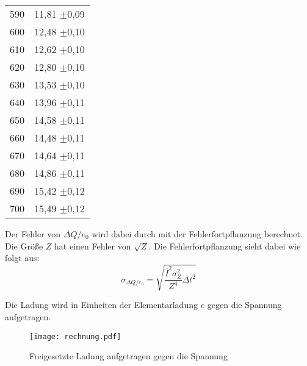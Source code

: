 \begin{table}[H]
\begin{tabular}{c c}
      590 &        11,81   $\pm$0,09 \\
      600 &        12,48   $\pm$0,10 \\
      610 &        12,62   $\pm$0,10 \\
      620 &        12,80   $\pm$0,10 \\
      630 &        13,53   $\pm$0,10 \\
      640 &        13,96   $\pm$0,11 \\
      650 &        14,58   $\pm$0,11 \\
      660 &        14,48   $\pm$0,11 \\
      670 &        14,64   $\pm$0,11 \\
      680 &        14,86   $\pm$0,11 \\
      690 &        15,42   $\pm$0,12 \\
      700 &        15,49   $\pm$0,12 \\
    \bottomrule
  \end{tabular}
\end{table}

Der Fehler von $\Delta Q/e_0$ wird dabei durch mit der Fehlerfortpflanzung berechnet. Die Größe $Z$ hat einen Fehler von $\sqrt{Z}$.
Die Fehlerfortpflanzung sieht dabei wie folgt aus:
\begin{equation*}
  \sigma_{\Delta Q/e_0} =\sqrt{ \frac{\overline{I}^{2} \sigma_{Z}^{2}}{Z^{4}} \Delta t^{2}}
\end{equation*}

Die Ladung wird in Einheiten der Elementarladung $e$ gegen die Spannung aufgetragen.

\begin{figure}
  \centering
  \texttt{[image: rechnung.pdf]}
  \caption{Freigesetzte Ladung aufgetragen gegen die Spannung}
  \label{fig:plot}
\end{figure}
